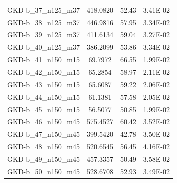 \begin{table}[H]
\begin{tabular}{@{}lccc@{}}
GKD-b\_37\_n125\_m37 & 418.0820                      & 52.43         & 3.41E-02        \\
GKD-b\_38\_n125\_m37 & 446.9816                      & 57.95         & 3.34E-02        \\
GKD-b\_39\_n125\_m37 & 411.6134                      & 59.04         & 3.27E-02        \\
GKD-b\_40\_n125\_m37 & 386.2099                      & 53.86         & 3.34E-02        \\
GKD-b\_41\_n150\_m15 & 69.7972                       & 66.55         & 1.99E-02        \\
GKD-b\_42\_n150\_m15 & 65.2854                       & 58.97         & 2.11E-02        \\
GKD-b\_43\_n150\_m15 & 65.6087                       & 59.22         & 2.06E-02        \\
GKD-b\_44\_n150\_m15 & 61.1381                       & 57.58         & 2.05E-02        \\
GKD-b\_45\_n150\_m15 & 56.5077                       & 50.85         & 1.99E-02        \\
GKD-b\_46\_n150\_m45 & 575.4527                      & 60.42         & 3.52E-02        \\
GKD-b\_47\_n150\_m45 & 399.5420                      & 42.78         & 3.50E-02        \\
GKD-b\_48\_n150\_m45 & 520.6545                      & 56.45         & 4.16E-02        \\
GKD-b\_49\_n150\_m45 & 457.3357                      & 50.49         & 3.58E-02        \\
GKD-b\_50\_n150\_m45 & 528.6708                      & 52.93         & 3.49E-02        \\ \bottomrule
\end{tabular}
\end{table}

